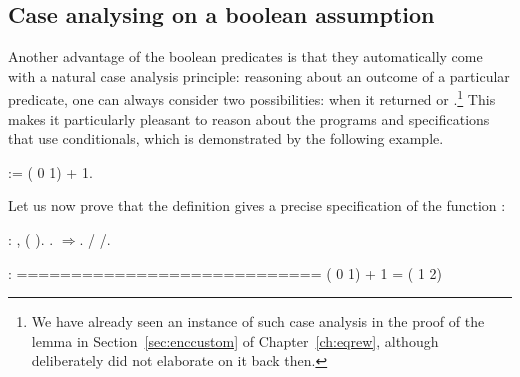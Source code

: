 \subsection{Case analysing on a boolean assumption}




Another advantage of the boolean predicates is that they automatically
come with a natural case analysis principle: reasoning about an
outcome of a particular predicate, one can always consider two
possibilities: when it returned  or .\footnote{We have
already seen an instance of such case analysis in the proof of the
 lemma in Section~\ref{sec:enccustom} of
Chapter~\ref{ch:eqrew}, although deliberately did not elaborate on it
back then.} This makes it particularly pleasant to reason about the
programs and specifications that use conditionals, which is
demonstrated by the following example.


\begin{coqdoccode}
\coqdocemptyline
\coqdocnoindent
{}   := (    0  1) + 1.\coqdoceol
\coqdocemptyline
\end{coqdoccode}


Let us now prove that the definition  gives a precise
specification of the function :


\begin{coqdoccode}
\coqdocemptyline
\coqdocnoindent
{}  : \coqdockw{\ensuremath{\forall}} ,   ( ).\coqdoceol
\coqdocnoindent
{}.\coqdoceol
\coqdocnoindent
{}\ensuremath{\Rightarrow}.  / /.\coqdoceol
\coqdocemptyline
\end{coqdoccode}


\coqdoceol
\coqdocemptyline
\coqdocindent{1.00em}
 : \coqdoceol
\coqdocindent{1.00em}
============================\coqdoceol
\coqdocindent{1.50em}
(    0  1) + 1 = (    1  2)

\coqdocemptyline


